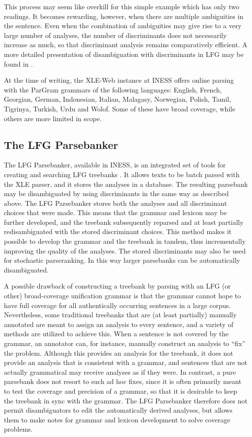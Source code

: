 \documentclass[output=paper,hidelinks]{langscibook}
\begin{document}
This process may seem like overkill for this simple example which has only two readings. %
It becomes rewarding, however, when there are multiple ambiguities in the sentence. %
Even when the combination of ambiguities may give rise to a very large number of analyses, the number of discriminants does not necessarily increase as much, so that discriminant analysis remains comparatively efficient.
A more detailed presentation of disambiguation with discriminants in LFG may be found in \citet{Rosen07lfg}.%

At the time of writing, the XLE-Web instance at INESS offers online parsing with the ParGram grammars of the following languages: English, French, Georgian, German, Indonesian, Italian, Malagasy, Norwegian, Polish, Tamil, Tigrinya, Turkish, Urdu and Wolof.
Some of these have broad coverage, while others are more limited in scope.

\subsection{The LFG Parsebanker}\label{parsebanker}

The LFG Parsebanker, available in INESS, is an integrated set of tools for creating and searching LFG treebanks \citep{Rosen09}. %
It allows texts to be batch parsed with the XLE parser, and it stores the analyses in a database. %
The resulting parsebank may be disambiguated by using discriminants in the same way as described above.
The LFG Parsebanker stores both the analyses and all discriminant choices that were made. %
This means that the grammar and lexicon may be further developed, and the treebank subsequently reparsed and at least partially redisambiguated with the stored discriminant choices.
This method makes it possible to develop the grammar and the treebank in tandem, thus incrementally improving the quality of the analyses.
The stored discriminants may also be used for stochastic parseranking.
In this way larger parsebanks can be automatically disambiguated.

A possible drawback of constructing a treebank by parsing with an LFG (or other) broad-coverage unification grammar is that the grammar cannot hope to have full coverage for all authentically occurring sentences in a large corpus.
Nevertheless, some traditional treebanks that are (at least partially) manually annotated are meant to assign an analysis to every sentence, and a variety of methods are utilized to achieve this.
When a sentence is not covered by the grammar, an annotator can, for instance, manually construct an analysis to ``fix'' the problem.
Although this provides an analysis for the treebank, it does not provide an analysis that is consistent with a grammar, and sentences that are not actually grammatical may receive analyses as if they were.
In contrast, a pure parsebank does not resort to such ad hoc fixes, since it is often primarily meant to test the coverage and precision of a grammar, so that it is desirable to keep the treebank in sync with the grammar.
The LFG Parsebanker therefore does not permit disambiguators to edit the automatically derived analyses, but allows them to make notes for grammar and lexicon development to solve coverage problems.
\end{document}
